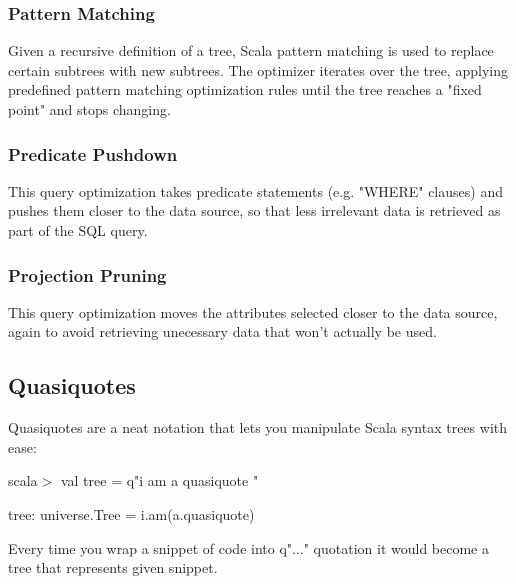 \documentclass[twoside]{article}
\begin{document}
\subsubsection{Pattern Matching}
Given a recursive definition of a tree, Scala pattern matching is used to replace certain subtrees with new subtrees. The optimizer iterates over the tree, applying predefined pattern matching optimization rules until the tree reaches a "fixed point" and stops changing.

\subsubsection{Predicate Pushdown}
This query optimization takes predicate statements (e.g. "WHERE" clauses) and pushes them closer to the data source, so that less irrelevant data is retrieved as part of the SQL query. 

\subsubsection{Projection Pruning}
This query optimization moves the attributes selected closer to the data source, again to avoid retrieving unecessary data that won't actually be used. 

\subsection{Quasiquotes}
Quasiquotes are a neat notation that lets you manipulate Scala syntax trees with ease:

scala$>$ val tree = q"i am { a quasiquote }"

tree: universe.Tree = i.am(a.quasiquote)

Every time you wrap a snippet of code into q"..." quotation it would become a tree that represents given snippet.
\end{document}
